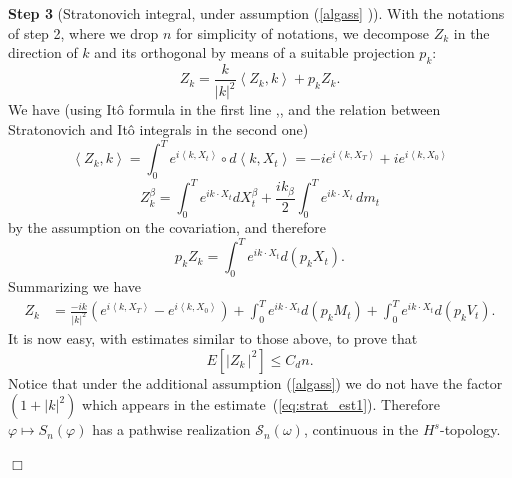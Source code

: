 \documentclass{article}
\newenvironment{proof}[1][Proof]{{\sc #1.} }{\hfill $\Box$}
\begin{document}
\begin{proof}
\textbf{Step 3} (Stratonovich integral, under assumption (\ref{algass}%
)). With the notations of step 2, where we drop $n$ for simplicity of
notations, we decompose $Z_{k}$ in the direction of $k$ and its orthogonal
by means of a suitable projection $p_{k}$: 
\begin{equation*}
Z_{k}=\frac{k}{\left| k\right| ^{2}}\left\langle Z_{k},k\right\rangle
+p_{k}Z_{k}.
\end{equation*}
We have (using It\^{o} formula in the first line \cite{RY},\cite{Kunita},
and the relation between Stratonovich and It\^{o} integrals in the second
one) 
\begin{equation*}
\left\langle Z_{k},k\right\rangle =\int_{0}^{T }e^{i\left\langle
k,X_{t}\right\rangle }\circ d\left\langle k,X_{t}\right\rangle
=-ie^{i\left\langle k,X_{T}\right\rangle }+ie^{i\left\langle
k,X_{0}\right\rangle }
\end{equation*}
\begin{equation*}
Z_{k}^{\beta }=\int_{0}^{T }e^{ik\cdot X_{t}}dX_{t}^{\beta }+\frac{i%
k_{\beta }}{2}\int_{0}^{T }e^{ik\cdot X_{t}}\,dm_{t}
\end{equation*}
by the assumption on the covariation, and therefore 
\begin{equation*}
p_{k}Z_{k}=\int_{0}^{T }e^{ik\cdot X_{t}}d\left( p_{k}X_{t}\right) .
\end{equation*}
Summarizing we have 
\begin{equation*}
  \begin{split}
Z_{k} & 
= \frac{-ik}{\left| k\right| ^{2}}\left( e^{i\left\langle
k,X_{T}\right\rangle }-e^{i\left\langle k,X_{0}\right\rangle }\right)
+\int_{0}^{T }e^{ik\cdot X_{t}}d\left( p_{k}M_{t}\right) +\int_{0}^{T
}e^{ik\cdot X_{t}}d\left( p_{k}V_{t}\right) .    
  \end{split}
\end{equation*}
It is now easy, with estimates similar to those above, to prove that 
\begin{equation*}
E\left[ \left| Z_{k}\,\right| ^{2}\right] \leq C_{d}n.
\end{equation*}
Notice that under the additional assumption (\ref{algass}) we do not have
the factor $( 1+\left| k\right| ^{2}) $ which appears in the
estimate~(\ref{eq:strat_est1}).  Therefore $\varphi
\mapsto S_{n}\left( \varphi \right) $ has a pathwise realization $\mathcal{S}%
_{n}\left( \omega \right) $, continuous in the $H^{s}$-topology.


\end{proof}
\end{document}
